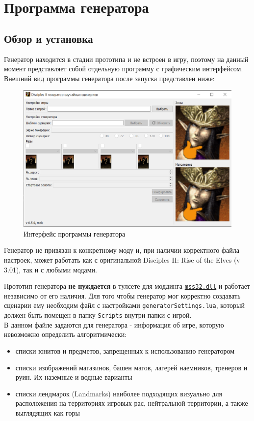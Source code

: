 \section{Программа генератора}
\subsection{Обзор и установка}
Генератор находится в стадии прототипа и не встроен в игру, поэтому на данный момент представляет собой отдельную программу с графическим интерфейсом. Внешний вид программы генератора после запуска представлен ниже:

\begin{figure}[H]
\center
\includegraphics[width=.8\linewidth]{docImages/interface.png}
\caption{Интерфейс программы генератора}
\end{figure}

Генератор не привязан к конкретному моду и, при наличии корректного файла настроек, может работать как с оригинальной Disciples II: Rise of the Elves (v 3.01), так и с любыми модами.

Прототип генератора \textbf{не нуждается} в тулсете для моддинга \href{https://github.com/VladimirMakeev/D2ModdingToolset}{\texttt{mss32.dll}} и работает независимо от его наличия.
Для того чтобы генератор мог корректно создавать сценарии ему необходим файл с настройками \texttt{generatorSettings.lua}, который должен быть помещен в папку \texttt{Scripts} внутри папки с игрой.\\
В данном файле задаются  для генератора - информация об игре, которую невозможно определить алгоритмически:
\begin{itemize}
\item списки юнитов и предметов, запрещенных к использованию генератором
\item списки изображений магазинов, башен магов, лагерей наемников, тренеров и руин. Их наземные и водные варианты
\item списки лендмарок (Landmarks) наиболее подходящих визуально для расположения на территориях игровых рас, нейтральной территории, а также выглядящих как горы
\end{itemize}

